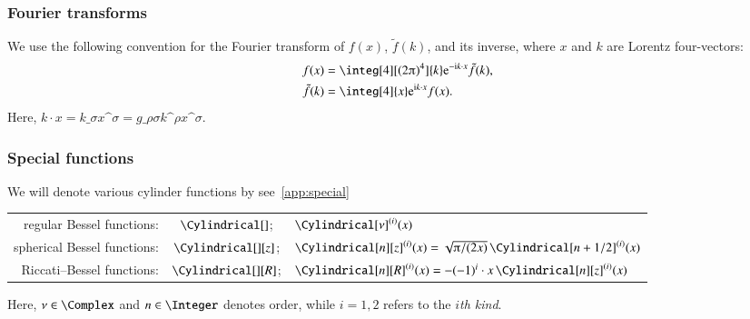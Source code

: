 \subsubsection{Fourier transforms} %
We use the following convention for the Fourier transform of $f(x)$, $\tilde{f}(k)$, and its inverse, where $x$ and $k$ are Lorentz four-vectors:
\begin{equation}
    \begin{split}
        f(x) &=  \integ[4][(2\ppi)^4]{k} \eu[-\im k\cdot x]\tilde{f}(k),  \\
        \tilde{f}(k) &= \integ[4]{x} \eu[\im k \cdot x] f(x) .
    \end{split}
\end{equation}
Here, $k\cdot x = k\_{\sigma} x\^{\sigma} = g\_{\rho\sigma} k\^{\rho} x\^{\sigma}$.


\subsubsection{Special functions} %
We will denote various cylinder functions by \blahblah see~\cref{app:special}

\begin{tabular*}{\linewidth}{r c l}
    regular Bessel functions: & $\Cylindrical[]$; & $\Cylindrical[\nu]^{(i)}(x)$  \\
    spherical Bessel functions: & $\Cylindrical[][z]$; &  $\Cylindrical[n][z]^{(i)}(x) = \sqrt{\ppi/(2x)} \,\Cylindrical[n+1/2]^{(i)}(x) $ \\
    Riccati--Bessel functions: & $\Cylindrical[][R]$; &  $\Cylindrical[n][R]^{(i)}(x) =-(-1)^{i}\cdot x\,\Cylindrical[n][z]^{(i)}(x) $ 
\end{tabular*}
Here, $\nu\in \Complex$ and $n\in\Integer$ denotes order, while $i=1,2$ refers to the \emph{$i$th kind}. 

